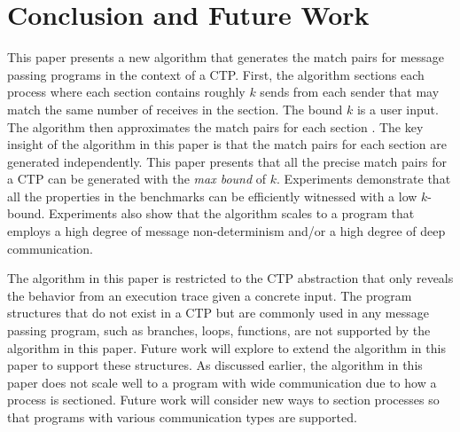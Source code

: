 \section{Conclusion and Future Work}
This paper presents a new algorithm that generates the match pairs for message passing programs in the context of a CTP.
First, the algorithm sections each process where each section contains roughly $k$ sends from each sender that may match the same number of receives in the section. The bound $k$ is a user input.
The algorithm then approximates the match pairs for each section \cite{DBLP:conf/kbse/HuangMM13}. The key insight of the algorithm in this paper is that the match pairs for each section are generated independently. 
This paper presents that all the precise match pairs for a CTP can be generated with the \textit{max bound} of $k$. Experiments demonstrate that all the properties in the benchmarks can be efficiently witnessed with a low $k$-bound. Experiments also show that the algorithm scales to a program that employs a high degree of message non-determinism and/or a high degree of deep communication.

The algorithm in this paper is restricted to the CTP abstraction that only reveals the behavior from an execution trace given a concrete input. The program structures that do not exist in a CTP but are commonly used in any message passing program, such as branches, loops, functions, are not supported by the algorithm in this paper. Future work will explore to extend the algorithm in this paper to support these structures. As discussed earlier, the algorithm in this paper does not scale well to a program with wide communication due to how a process is sectioned. Future work will consider new ways to section processes so that programs with various communication types are supported.
